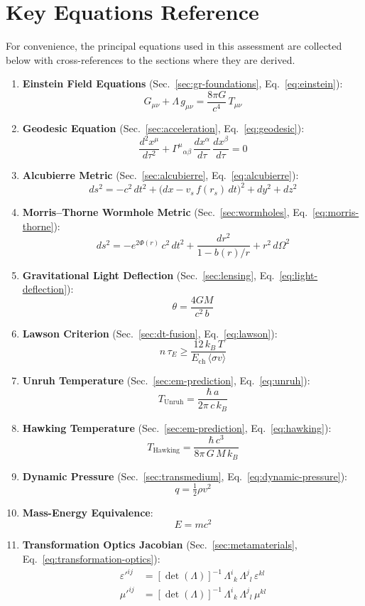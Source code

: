 \documentclass[aps,prd,twocolumn,superscriptaddress,nofootinbib,floatfix]{revtex4-2}
\begin{document}
\section{Key Equations Reference}\label{app:equations}

For convenience, the principal equations used in this assessment are collected
below with cross-references to the sections where they are derived.

\begin{enumerate}
  \item \textbf{Einstein Field Equations} (Sec.~\ref{sec:gr-foundations},
    Eq.~\ref{eq:einstein}):
    \[
      G_{\mu\nu} + \Lambda\,g_{\mu\nu}
      = \frac{8\pi G}{c^{4}}\,T_{\mu\nu}
    \]
  \item \textbf{Geodesic Equation} (Sec.~\ref{sec:acceleration},
    Eq.~\ref{eq:geodesic}):
    \[
      \frac{d^{2}x^{\mu}}{d\tau^{2}}
      + \Gamma^{\mu}{}_{\alpha\beta}\,
        \frac{dx^{\alpha}}{d\tau}\,\frac{dx^{\beta}}{d\tau} = 0
    \]
  \item \textbf{Alcubierre Metric} (Sec.~\ref{sec:alcubierre},
    Eq.~\ref{eq:alcubierre}):
    \[
      ds^{2} = -c^{2}\,dt^{2}
      + \bigl(dx - v_{s}\,f(r_{s})\,dt\bigr)^{2}
      + dy^{2} + dz^{2}
    \]
  \item \textbf{Morris--Thorne Wormhole Metric} (Sec.~\ref{sec:wormholes},
    Eq.~\ref{eq:morris-thorne}):
    \[
      ds^{2} = -e^{2\Phi(r)}\,c^{2}\,dt^{2}
      + \frac{dr^{2}}{1 - b(r)/r}
      + r^{2}\,d\Omega^{2}
    \]
  \item \textbf{Gravitational Light Deflection} (Sec.~\ref{sec:lensing},
    Eq.~\ref{eq:light-deflection}):
    \[
      \theta = \frac{4GM}{c^{2}\,b}
    \]
  \item \textbf{Lawson Criterion} (Sec.~\ref{sec:dt-fusion},
    Eq.~\ref{eq:lawson}):
    \[
      n\,\tau_{E} \ge \frac{12\,k_{B}\,T}{E_{\mathrm{ch}}\,\langle\sigma v\rangle}
    \]
  \item \textbf{Unruh Temperature} (Sec.~\ref{sec:em-prediction},
    Eq.~\ref{eq:unruh}):
    \[
      T_{\text{Unruh}} = \frac{\hbar\,a}{2\pi\,c\,k_{B}}
    \]
  \item \textbf{Hawking Temperature} (Sec.~\ref{sec:em-prediction},
    Eq.~\ref{eq:hawking}):
    \[
      T_{\text{Hawking}} = \frac{\hbar\,c^{3}}{8\pi\,G\,M\,k_{B}}
    \]
  \item \textbf{Dynamic Pressure} (Sec.~\ref{sec:transmedium},
    Eq.~\ref{eq:dynamic-pressure}):
    \[
      q = \tfrac{1}{2}\rho v^{2}
    \]
  \item \textbf{Mass-Energy Equivalence}:
    \[
      E = mc^{2}
    \]
  \item \textbf{Transformation Optics Jacobian} (Sec.~\ref{sec:metamaterials},
    Eq.~\ref{eq:transformation-optics}):
    \[
      \begin{aligned}
      \varepsilon'^{ij} &= [\det(\Lambda)]^{-1}\,
        \Lambda^{i}{}_{k}\,\Lambda^{j}{}_{l}\,\varepsilon^{kl}\\
      \mu'^{ij} &= [\det(\Lambda)]^{-1}\,
        \Lambda^{i}{}_{k}\,\Lambda^{j}{}_{l}\,\mu^{kl}
      \end{aligned}
    \]
\end{enumerate}
\end{document}
